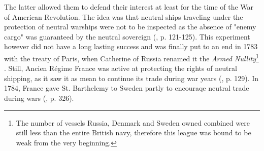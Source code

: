 \documentclass[12pt,a4paper,notitlepage,english]{article}
\begin{document}
The latter allowed them to defend their interest at least for the time of the War of American Revolution.
The idea was that neutral ships traveling under the protection of neutral warships were not to be inspected as the absence of "enemy cargo" was guaranteed by the neutral sovereign (\cite{Schnakenbourg2013}, p. 121-125).
This experiment however did not have a long lasting success and was finally put to an end in 1783 with the treaty of Paris, when Catherine of Russia renamed it the \textit{Armed Nullity}\footnote{The number of vessels Russia, Denmark and Sweden owned combined were still less than the entire British navy, therefore this league was bound to be weak from the very beginning.} \citep{Griffiths1971}.
Still, Ancien Régime France was active at protecting the rights of neutral shipping, as it saw it as mean to continue its trade during war years (\cite{Schnakenbourg2013}, p. 129).
In 1784, France gave St. Barthelemy to Sweden partly to encouraqe neutral trade during wars (\cite{Schnakenbourg2013}, p. 326).
\end{document}
